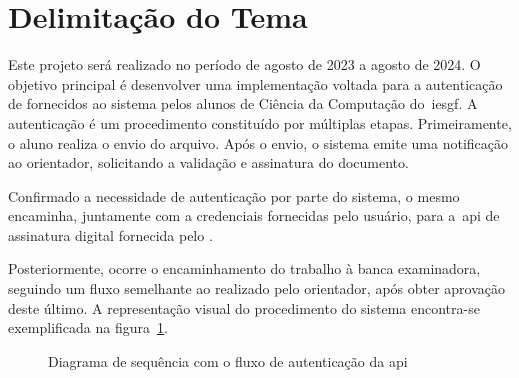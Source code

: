 \section{Delimitação do Tema}\label{sec:delimitacao-do-tema}

Este projeto será realizado no período de agosto de 2023 a agosto de 2024.
O objetivo principal é desenvolver uma implementação voltada para a
autenticação de  fornecidos ao sistema pelos alunos de Ciência da
Computação do~\acrfull{iesgf}.
A autenticação é um procedimento constituído por múltiplas etapas.
Primeiramente, o aluno realiza o envio do arquivo.
Após o envio, o sistema emite uma notificação ao orientador, solicitando a
validação e assinatura do documento.

Confirmado a necessidade de autenticação por parte do sistema, o mesmo
encaminha, juntamente com a credenciais fornecidas pelo usuário, para a~\acrshort{api} de
assinatura digital fornecida pelo \citeauthor*{govbr2020}.

Posteriormente, ocorre o encaminhamento do trabalho à banca examinadora,
seguindo um fluxo semelhante ao realizado pelo orientador, após obter aprovação
deste último.
A representação visual do procedimento do sistema encontra-se exemplificada
na figura~\ref{fig:diagrama-sequencia-api}.

\begin{figure}[h!]
    \caption[Diagrama de sequência Autenticação \acrshort{api}]{
        Diagrama de sequência com o fluxo de autenticação
        da \acrshort{api}}
    \sourcesearchfootnote
    \label{fig:diagrama-sequencia-api}
\end{figure}

